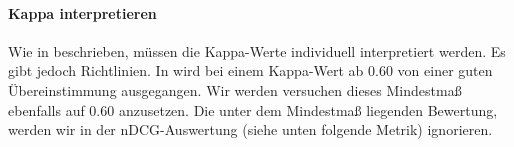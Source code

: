 \begin{table}[H]
\centering
\vspace{-.5em}
\caption[Beispiel Gewichtung in Übereinstimmungsmatrix für $p_{0_{w}}$]{Beispiel Gewichtung in Übereinstimmungsmatrix für $p_{0_{w}}$}
\label{tab:GewichtungKreuztabelleKappaBerechnung}
\vspace{-.5em}
\vspace{-1.5em}
\end{table}

\paragraph{Kappa interpretieren}

Wie in \cite{KappaWerte} beschrieben, müssen die Kappa-Werte individuell interpretiert werden. Es gibt jedoch Richtlinien. In \cite{Kappa} wird bei einem Kappa-Wert ab 0.60 von einer guten Übereinstimmung ausgegangen. Wir werden versuchen dieses Mindestmaß ebenfalls auf 0.60 anzusetzen. Die unter dem Mindestmaß liegenden Bewertung, werden wir in der nDCG-Auswertung (siehe unten folgende Metrik) ignorieren. 

